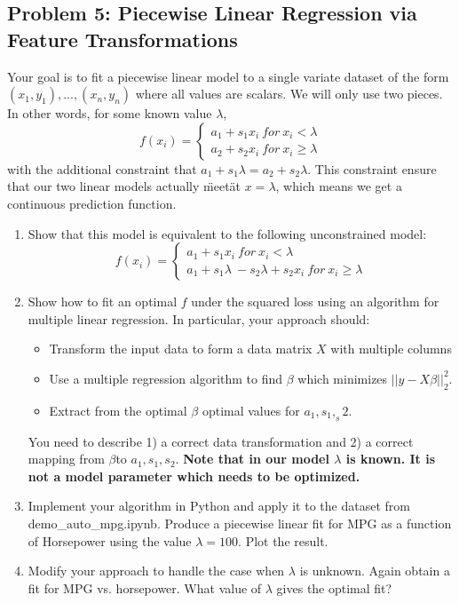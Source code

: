 \documentclass{assignment}
\begin{document}
\begin{problem}
    \section{Problem 5: Piecewise Linear Regression via Feature Transformations}
    \noindent Your goal is to fit a piecewise linear model to a single variate dataset of the form $(x_1, y_1),...,(x_n,y_n)$ where all values are scalars. We will only use two pieces. In other words, for some known value $\lambda$,
    \begin{equation}
        f(x_i) = \begin{cases}
            a_1+s_1x_i\ for\ x_i < \lambda \\  
            a_2+s_2x_i\ for\ x_i \geq \lambda
        \end{cases}
    \end{equation}
with the additional constraint that $a_1+s_1\lambda = a_2 + s_2\lambda$. This constraint ensure that our two linear models actually \"meet\" at $x = \lambda$, which means we get a continuous prediction function. \\
\begin{enumerate}[label=(\alph*)]
    \item Show that this model is equivalent to the following unconstrained model:
    \begin{equation}
        f(x_i) = \begin{cases}
            a_1+s_1x_i\ for\ x_i < \lambda \\  
            a_1+s_1\lambda\ - s_2\lambda + s_2x_i\ for\ x_i \geq \lambda
        \end{cases}
    \end{equation}
    \item  Show how to fit an optimal $f$ under the squared loss using an algorithm for multiple linear regression. In particular, your approach should:
    \begin{itemize}
        \item Transform the input data to form a data matrix $X$ with multiple columns
        \item Use a multiple regression algorithm to find $\beta$ which minimizes $||y-X\beta||^2_2$.
        \item Extract from the optimal $\beta$ optimal values for $a_1,s_1,_s2$.
    \end{itemize}
    You need to describe 1) a correct data transformation and 2) a correct mapping from $\beta$to $a_1,s_1,s_2$. \textbf{Note that in our model $\lambda$ is known. It is not a model parameter which needs to be optimized.}
    \item Implement your algorithm in Python and apply it to the dataset from demo\_auto\_mpg.ipynb. Produce a piecewise linear fit for MPG as a function of Horsepower using the value $\lambda = 100$. Plot the result.
    \item Modify your approach to handle the case when $\lambda$ is unknown. Again obtain a fit for MPG vs. horsepower. What value of $\lambda$ gives the optimal fit? 
\end{enumerate}


\end{problem}
\end{document}
